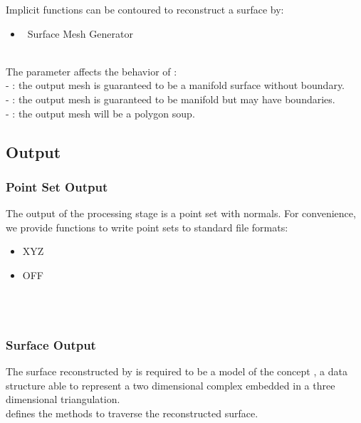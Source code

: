 Implicit functions can be contoured to reconstruct a surface by:

\begin{itemize}
\item \cgal\ Surface Mesh Generator~\cite{cgal:ry-gsddrm-06,cgal:bo-pgsms-05}
\end{itemize}

  \\

The parameter  affects the behavior of : \\
- : the output mesh is guaranteed to be a manifold
surface without boundary.\\
- : the output mesh is guaranteed to be
manifold but may have boundaries.\\
- : the output mesh will be a polygon soup.


\subsection{Output}

\subsubsection{Point Set Output}

The output of the processing stage is a point set with normals.
For convenience, we provide functions to write point sets to standard file formats:

\begin{itemize}
\item XYZ
\item OFF
\end{itemize}

  \\
  \\


\subsubsection{Surface Output}

The surface reconstructed by 
is required to be a model of the concept
,
a data structure able to represent a two dimensional
complex embedded in a three dimensional triangulation. \\
 defines the methods to traverse the reconstructed surface.

